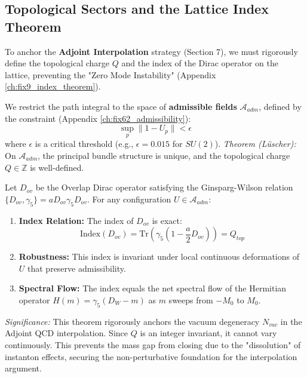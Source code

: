 \subsection{Topological Sectors and the Lattice Index Theorem}

To anchor the \textbf{Adjoint Interpolation} strategy (Section 7), we must rigorously define the topological charge $Q$ and the index of the Dirac operator on the lattice, preventing the "Zero Mode Instability" (Appendix \ref{ch:fix9_index_theorem}).

\begin{definition}
We restrict the path integral to the space of \textbf{admissible fields} $\mathcal{A}_{adm}$, defined by the constraint (Appendix \ref{ch:fix62_admissibility}):
\begin{equation}
\sup_p \| 1 - U_p \| < \epsilon
\end{equation}
where $\epsilon$ is a critical threshold (e.g., $\epsilon = 0.015$ for $SU(2)$).
\textit{Theorem (Lüscher):} On $\mathcal{A}_{adm}$, the principal bundle structure is unique, and the topological charge $Q \in \mathbb{Z}$ is well-defined.
\end{definition}

\begin{theorem}
Let $D_{ov}$ be the Overlap Dirac operator satisfying the Ginsparg-Wilson relation $\{D_{ov}, \gamma_5\} = a D_{ov} \gamma_5 D_{ov}$. For any configuration $U \in \mathcal{A}_{adm}$:

\begin{enumerate}
    \item \textbf{Index Relation:} The index of $D_{ov}$ is exact:
    \begin{equation}
    \text{Index}(D_{ov}) = \text{Tr}(\gamma_5 (1 - \frac{a}{2} D_{ov})) = Q_{top}
    \end{equation}
    \item \textbf{Robustness:} This index is invariant under local continuous deformations of $U$ that preserve admissibility.
    \item \textbf{Spectral Flow:} The index equals the net spectral flow of the Hermitian operator $H(m) = \gamma_5(D_W - m)$ as $m$ sweeps from $-M_0$ to $M_0$.
\end{enumerate}

\textit{Significance:} This theorem rigorously anchors the vacuum degeneracy $N_{vac}$ in the Adjoint QCD interpolation. Since $Q$ is an integer invariant, it cannot vary continuously. This prevents the mass gap from closing due to the "dissolution" of instanton effects, securing the non-perturbative foundation for the interpolation argument.
\end{theorem}

